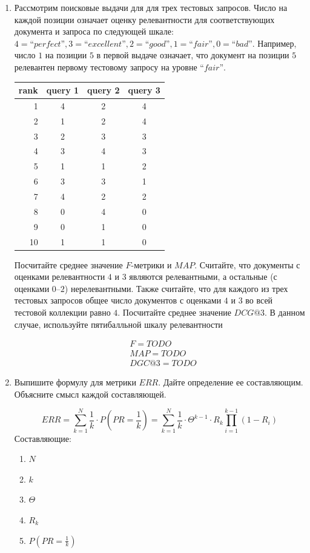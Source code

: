 \begin{enumerate}
	\item Рассмотрим поисковые выдачи для для трех тестовых запросов. Число на каждой позиции 
	означает оценку релевантности для соответствующих документа и запроса по следующей шкале: 
	$4 = “perfect”, 3 = “excellent”, 2 = “good”, 1 = “fair”, 0 = “bad”$. Например, число $1$ 
	на позиции $5$ в первой выдаче означает, что документ на позиции $5$ релевантен первому 
	тестовому запросу на уровне $“fair”$.
	
	\begin{tabular}{ r | c | c | c }
		rank & query 1 & query 2 & query 3 \\
		\hline
		1 & 4 & 2 & 4  \\
		2 & 1 & 2 & 4  \\
		3 & 2 & 3 & 3  \\
		4 & 3 & 4 & 3  \\
		5 & 1 & 1 & 2  \\
		6 & 3 & 3 & 1  \\
		7 & 4 & 2 & 2  \\
		8 & 0 & 4 & 0  \\
		9 & 0 & 1 & 0  \\
		10 & 1 & 1 & 0 \\
	\end{tabular}
	
	Посчитайте среднее значение $F$-метрики и $MAP$. Считайте, что документы с оценками 
	релевантности $4$ и $3$ являются релевантными, а остальные (с оценками $0–2$)	
	нерелевантными. Также считайте, что для каждого из трех тестовых запросов общее число 
	документов с оценками $4$ и $3$ во всей тестовой коллекции равно $4$. Посчитайте среднее 
	значение $DCG@3$. В данном случае, используйте пятибалльной шкалу релевантности
	
	\begin{align*}
		&F = TODO \\
		&MAP = TODO \\
		&DGC@3 = TODO
	\end{align*}
	
	\item Выпишите формулу для метрики $ERR$. Дайте определение ее составляющим. Объясните 
	смысл каждой составляющей.
	
	\begin{equation*}
		ERR = \sum\limits_{k = 1}^{N}\frac{1}{k}\cdot P(PR = \frac{1}{k}) = 
		\sum\limits_{k = 1}^{N}\frac{1}{k}\cdot \varTheta^{k - 1}\cdot R_k \prod\limits_{i = 1}^ {k - 1}(1 - R_i) 
	\end{equation*}
	Составляющие:
	\begin{enumerate}
		\item $N$  
		\item $k$
		\item $\varTheta$
		\item $R_k$
		\item $P(PR = \frac{1}{k})$
	\end{enumerate}


\end{enumerate}
